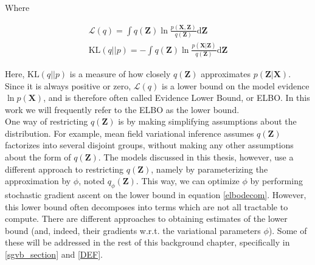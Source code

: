 \documentclass{report}
\begin{document}
Where

\begin{align}
\mathcal{L}(q) = \int q(\mathbf{Z}) \ln \frac{p(\mathbf{X},\mathbf{{Z}})}{q(\mathbf{Z})}\text{d}\mathbf{Z} \label{elbodecom}\\
\text{KL}(q||p) = -\int q(\mathbf{Z}) \ln \frac{p(\mathbf{X}|\mathbf{{Z}})}{q(\mathbf{Z})}\text{d}\mathbf{Z}
\end{align}

Here, $\text{KL}(q||p)$ is a measure of how closely $q(\mathbf{Z})$ approximates $p(\mathbf{Z|X})$. Since it is always positive or zero, $\mathcal{L}(q)$ is a lower bound on the model evidence $\ln p(\mathbf{X})$, and is therefore often called Evidence Lower Bound, or ELBO. In this work we will frequently refer to the ELBO as the lower bound. \\
One way of restricting $q(\mathbf{Z})$ is by making simplifying assumptions about the distribution. For example, mean field variational inference \cite{bishop2006pattern} assumes $q(\mathbf{Z})$ factorizes into several disjoint groups, without making any other assumptions about the form of $q(\mathbf{Z})$. The models discussed in this thesis, however, use a different approach to restricting $q(\mathbf{Z})$, namely by parameterizing the approximation  by $\phi$, noted $q_\phi(\mathbf{Z})$. This way, we can optimize $\phi$ by performing stochastic gradient ascent on the lower bound in equation \ref{elbodecom}. However, this lower bound often decomposes into terms which are not all tractable to compute. There are different approaches to obtaining estimates of the lower bound (and, indeed, their gradients w.r.t. the variational parameters $\phi$). Some of these will be addressed in the rest of this background chapter, specifically in \ref{sgvb_section} and \ref{DEF}.
\end{document}
